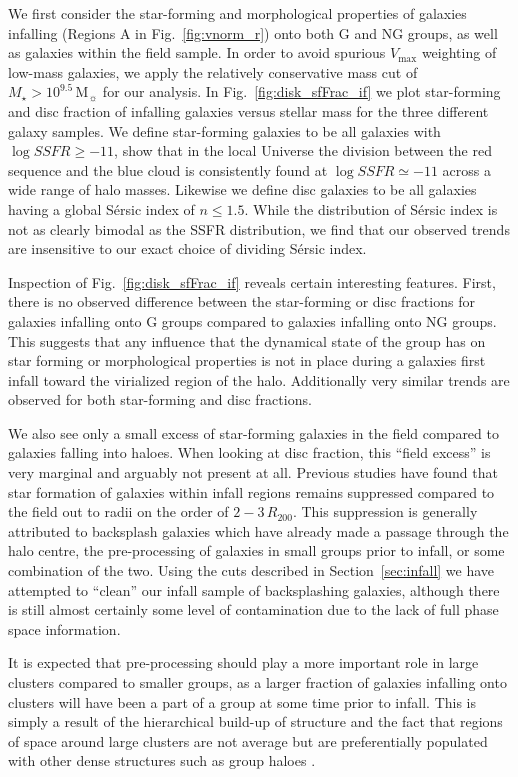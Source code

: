 \documentclass[a4paper,fleqn,usenatbib]{mnras}
\newcommand{\Msun}{\,\mathrm{M_{\sun}}}
\begin{document}
We first consider the star-forming and morphological properties of
galaxies infalling (Regions A in Fig.~\ref{fig:vnorm_r}) onto both G
and NG groups, as well as galaxies within the field sample.  In order
to avoid spurious $V_\mathrm{max}$ weighting of low-mass galaxies, we
apply the relatively conservative mass cut of $M_\star >
10^{9.5}\Msun$ for our analysis.  In
Fig.~\ref{fig:disk_sfFrac_if} we plot star-forming and disc fraction
of infalling galaxies
versus stellar mass for the three different galaxy samples.  We define
star-forming galaxies to be all galaxies with $\log SSFR \ge -11$,
\citet{wetzel2012} show that in the local Universe the division
between the red sequence and the blue cloud is consistently found at
$\log SSFR \simeq -11$ across a wide range of halo masses.  Likewise
we define disc galaxies to be all galaxies having a global S\'{e}rsic
index of $n \le 1.5$.  While the distribution of S\'{e}rsic index is
not as clearly bimodal as the SSFR distribution, we find that our
observed trends are insensitive to our exact choice of dividing S\'{e}rsic
index.
\par
Inspection of Fig.~\ref{fig:disk_sfFrac_if} reveals certain
interesting features.  First, there is no observed difference
between the star-forming or disc fractions for galaxies infalling onto
G groups compared to galaxies infalling onto NG
groups.  This suggests that any influence that the dynamical state
of the group
has on star forming or morphological properties is not in place during
a galaxies first infall toward the virialized region of the halo.
Additionally very similar trends are observed for both star-forming and
disc fractions.
\par
We also see only a small excess of star-forming galaxies in the field
compared to galaxies falling into haloes.  When looking at disc fraction, this
``field excess'' is very marginal and arguably not present at all.
Previous studies \citep{lewis2002, gray2004, rines2005, verdugo2008}
have found that star formation of galaxies within infall regions
remains suppressed compared to the field out to radii on the order of
$2-3\,R_{200}$.  This suppression is generally attributed to
backsplash galaxies which have already made a passage through the halo
centre, the pre-processing of galaxies in small groups prior to
infall, or some combination of the two.  Using the cuts described in
Section~\ref{sec:infall} we have attempted to ``clean'' our infall sample
of backsplashing galaxies, although there is still almost certainly
some level of contamination due to the lack of full phase space information.
\par
It is expected that pre-processing
should play a more important role in large clusters compared to smaller
groups, as a larger fraction of galaxies infalling onto clusters will
have been a part of a group at some time prior to infall.  This is
simply a result of the hierarchical build-up of structure and the
fact that regions of space around large clusters are not average but
are preferentially populated with other dense structures such as group
haloes \citep[e.g.][]{mo1996, wang2008}.
\end{document}
